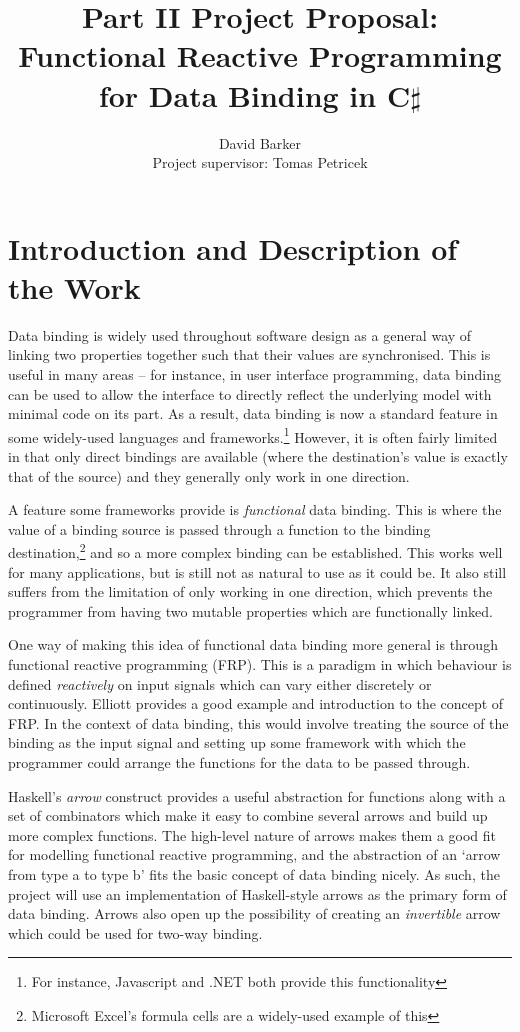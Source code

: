 \documentclass[12pt,a4]{article}
\title{Part II Project Proposal: Functional Reactive Programming for Data Binding in C$\sharp$ }
\author{David Barker\\Project supervisor: Tomas Petricek}
\begin{document}
\maketitle

\section{Introduction and Description of the Work}

	Data binding is widely used throughout software design as a general way of linking two properties together such that their values are synchronised. This is useful in many areas -- for instance, in user interface programming, data binding can be used to allow the interface to directly reflect the underlying model with minimal code on its part. As a result, data binding is now a standard feature in some widely-used languages and frameworks.\footnote{For instance, Javascript\cite{javabinding} and .NET\cite{netbinding} both provide this functionality} However, it is often fairly limited in that only direct bindings are available (where the destination's value is exactly that of the source) and they generally only work in one direction.
	
	A feature some frameworks provide is \textit{functional} data binding. This is where the value of a binding source is passed through a function to the binding destination,\footnote{Microsoft Excel's formula cells are a widely-used example of this} and so a more complex binding can be established. This works well for many applications, but is still not as natural to use as it could be. It also still suffers from the limitation of only working in one direction, which prevents the programmer from having two mutable properties which are functionally linked.
	
	One way of making this idea of functional data binding more general is through functional reactive programming (FRP). This is a paradigm in which behaviour is defined \textit{reactively} on input signals which can vary either discretely or continuously. Elliott\cite{elliott98} provides a good example and introduction to the concept of FRP. In the context of data binding, this would involve treating the source of the binding as the input signal and setting up some framework with which the programmer could arrange the functions for the data to be passed through.
	
	Haskell's \textit{arrow} construct\cite{haskellarrows} provides a useful abstraction for functions along with a set of combinators which make it easy to combine several arrows and build up more complex functions.\cite{paterson03} The high-level nature of arrows makes them a good fit for modelling functional reactive programming, and the abstraction of an `arrow from type a to type b' fits the basic concept of data binding nicely. As such, the project will use an implementation of Haskell-style arrows as the primary form of data binding. Arrows also open up the possibility of creating an \textit{invertible} arrow which could be used for two-way binding.
	
\end{document}
